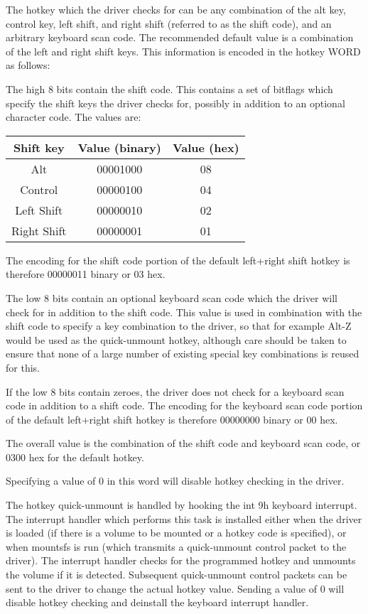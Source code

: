 \begin{itemize}
The hotkey which the driver checks for can be any combination of the alt key,
control key, left shift, and right shift (referred to as the shift code), and
an arbitrary keyboard scan code.  The recommended default value is a
combination of the left and right shift keys.  This information is encoded in
the hotkey WORD as follows:

  The high 8 bits contain the shift code.  This contains a set of bitflags
  which specify the shift keys the driver checks for, possibly in addition to
  an optional character code.  The values are:

\begin{center}
\begin{tabular}{|c|c|c|}
\hline
        Shift key   &    Value (binary)   &   Value (hex)\\
\hline
           Alt      &       00001000      &       08\\
         Control    &       00000100      &       04\\
       Left Shift   &       00000010      &       02\\
      Right Shift   &       00000001      &       01\\
\hline
\end{tabular}
\end{center}

  The encoding for the shift code portion of the default left+right shift
  hotkey is therefore 00000011 binary or 03 hex.

  The low 8 bits contain an optional keyboard scan code which the driver will
  check for in addition to the shift code.  This value is used in combination
  with the shift code to specify a key combination to the driver, so that for
  example Alt-Z would be used as the quick-unmount hotkey, although care should
  be taken to ensure that none of a large number of existing special key
  combinations is reused for this.

  If the low 8 bits contain zeroes, the driver does not check for a keyboard
  scan code in addition to a shift code.  The encoding for the keyboard scan
  code portion of the default left+right shift hotkey is therefore 00000000
  binary or 00 hex.

  The overall value is the combination of the shift code and keyboard scan
  code, or 0300 hex for the default hotkey.

Specifying a value of 0 in this word will disable hotkey checking in the
driver.

The hotkey quick-unmount is handled by hooking the int 9h keyboard interrupt.
The interrupt handler which performs this task is installed either when the
driver is loaded (if there is a volume to be mounted or a hotkey code is
specified), or when mountsfs is run (which transmits a quick-unmount control
packet to the driver).  The interrupt handler checks for the programmed hotkey
and unmounts the volume if it is detected.  Subsequent quick-unmount control
packets can be sent to the driver to change the actual hotkey value.  Sending a
value of 0 will disable hotkey checking and deinstall the keyboard interrupt
handler.



\end{itemize}
